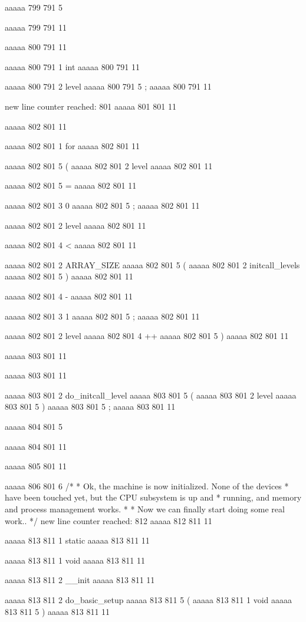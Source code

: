 aaaaa 799 791
5
{
aaaaa 799 791
11


aaaaa 800 791
11
	
aaaaa 800 791
1
int
aaaaa 800 791
11
 
aaaaa 800 791
2
level
aaaaa 800 791
5
;
aaaaa 800 791
11


new line counter reached: 801
aaaaa 801 801
11


aaaaa 802 801
11
	
aaaaa 802 801
1
for
aaaaa 802 801
11
 
aaaaa 802 801
5
(
aaaaa 802 801
2
level
aaaaa 802 801
11
 
aaaaa 802 801
5
=
aaaaa 802 801
11
 
aaaaa 802 801
3
0
aaaaa 802 801
5
;
aaaaa 802 801
11
 
aaaaa 802 801
2
level
aaaaa 802 801
11
 
aaaaa 802 801
4
<
aaaaa 802 801
11
 
aaaaa 802 801
2
ARRAY_SIZE
aaaaa 802 801
5
(
aaaaa 802 801
2
initcall_levels
aaaaa 802 801
5
)
aaaaa 802 801
11
 
aaaaa 802 801
4
-
aaaaa 802 801
11
 
aaaaa 802 801
3
1
aaaaa 802 801
5
;
aaaaa 802 801
11
 
aaaaa 802 801
2
level
aaaaa 802 801
4
++
aaaaa 802 801
5
)
aaaaa 802 801
11


aaaaa 803 801
11
	
aaaaa 803 801
11
	
aaaaa 803 801
2
do_initcall_level
aaaaa 803 801
5
(
aaaaa 803 801
2
level
aaaaa 803 801
5
)
aaaaa 803 801
5
;
aaaaa 803 801
11


aaaaa 804 801
5
}
aaaaa 804 801
11


aaaaa 805 801
11


aaaaa 806 801
6
/*
 * Ok, the machine is now initialized. None of the devices
 * have been touched yet, but the CPU subsystem is up and
 * running, and memory and process management works.
 *
 * Now we can finally start doing some real work..
 */
new line counter reached: 812
aaaaa 812 811
11


aaaaa 813 811
1
static
aaaaa 813 811
11
 
aaaaa 813 811
1
void
aaaaa 813 811
11
 
aaaaa 813 811
2
__init
aaaaa 813 811
11
 
aaaaa 813 811
2
do_basic_setup
aaaaa 813 811
5
(
aaaaa 813 811
1
void
aaaaa 813 811
5
)
aaaaa 813 811
11


